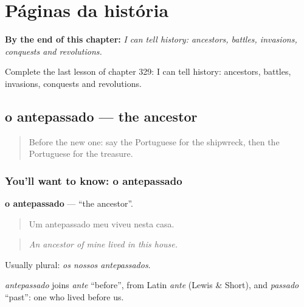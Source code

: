 
\chapter{Páginas da história}
\label{ch:pt-paginas-da-historia}

\begin{chapteropening}
\textbf{By the end of this chapter:} \emph{I can tell history: ancestors, battles, invasions, conquests and revolutions.}

Complete the last lesson of chapter 329: I can tell history: ancestors, battles, invasions, conquests and revolutions.
\end{chapteropening}

\section[o antepassado]{o antepassado — the ancestor}

\label{lesson:PT-C329-antepassado}



\begin{quote}
Before the new one: say the Portuguese for the shipwreck, then the Portuguese for the treasure.
\end{quote}

\subsection*{You'll want to know: o antepassado}
\textbf{o antepassado} — \textquotedblleft{}the ancestor\textquotedblright{}.

\begin{quote}
Um antepassado meu viveu nesta casa.
\end{quote}

\begin{quote}
\emph{An ancestor of mine lived in this house.}
\end{quote}

Usually plural: \emph{os nossos antepassados}.

\begin{cousinweb}
\emph{antepassado} joins \emph{ante} \textquotedblleft{}before\textquotedblright{}, from Latin \emph{ante} (Lewis \& Short), and \emph{passado} \textquotedblleft{}past\textquotedblright{}: one who lived before us.
\end{cousinweb}

